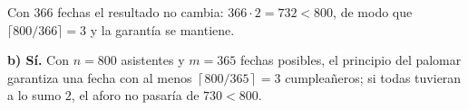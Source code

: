 \documentclass[11pt]{article}
\begin{document}
\begin{nota}
Con $366$ fechas el resultado no cambia: $366\cdot 2 = 732 < 800$, de modo que $\lceil 800/366\rceil = 3$ y la garantía se mantiene.
\end{nota}

\begin{resp}
\textbf{b) Sí.} Con $n=800$ asistentes y $m=365$ fechas posibles, el principio del palomar garantiza una fecha con al menos $\left\lceil 800/365\right\rceil=3$ cumpleañeros; si todas tuvieran a lo sumo $2$, el aforo no pasaría de $730<800$.
\end{resp}
\end{document}
